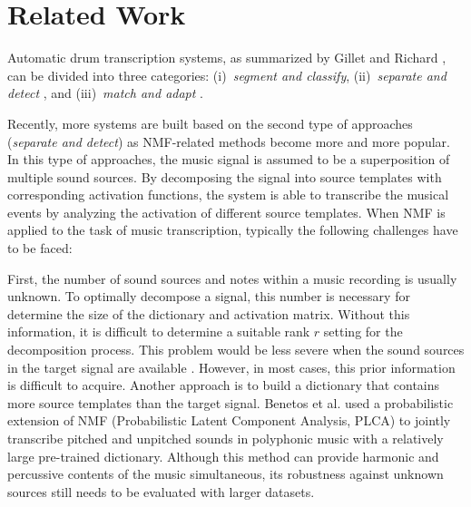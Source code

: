 \documentclass{article}
\begin{document}
\section{Related Work}\label{sec:related works}
Automatic drum transcription systems, as summarized by Gillet and Richard \cite{gillet_transcription_2008}, can be divided into three categories: (i)~\textit{segment and classify}\cite{gillet_automatic_2004, tanghe_algorithm_2005, dittmar_drum_2005}, (ii)~\textit{separate and detect} \cite{fitzgerald_sub-band_2002, fitzgerald_drum_2003, paulus_drum_2005,moreau_drum_2007,alves_drum_2009}, and (iii)~\textit{match and adapt} \cite{yoshii_automatic_2004, yoshii_drum_2007}. 

Recently, more systems are built based on the second type of approaches (\textit{separate and detect}) as NMF-related methods become more and more popular. In this type of approaches, the music signal is assumed to be a superposition of multiple sound sources. By decomposing the signal into source templates with corresponding activation functions, the system is able to transcribe the musical events by analyzing the activation of different source templates. When NMF is applied to the task of music transcription, typically the following challenges have to be faced:

First, the number of sound sources and notes within a music recording is usually unknown. To optimally decompose a signal, this number is necessary for determine the size of the dictionary and activation matrix. Without this information, it is difficult to determine a suitable rank $r$ setting for the decomposition process. This problem would be less severe when the sound sources in the target signal are available \cite{Lindsay-Smith2012}. However, in most cases, this prior information is difficult to acquire. Another approach is to build a dictionary that contains more source templates than the target signal. Benetos et al. used a probabilistic extension of NMF (Probabilistic Latent Component Analysis, PLCA) to jointly transcribe pitched and unpitched sounds in polyphonic music with a relatively large pre-trained dictionary\cite{Benetos2014}. Although this method can provide harmonic and percussive contents of the music simultaneous, its robustness against unknown sources still needs to be evaluated with larger datasets. 
\end{document}
